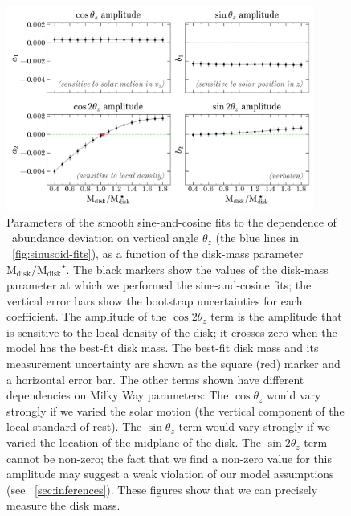 \documentclass[modern]{aastex63}
\newcommand{\ofe}{\abunratio{O}{Fe}}
\newcommand{\mdisk}{\ensuremath{\mathrm{M}_\mathrm{disk}}}
\newcommand{\mratio}{\ensuremath{\mdisk / \mdisk^\star}}
\begin{document}
\begin{figure}[!tp] %
  \begin{mdframed}
    \color{captiongray}
  \begin{center}
  \includegraphics[width=0.9\textwidth]{coeff-vs-mdisk.pdf}
  \end{center}
  \caption{%
    Parameters of the smooth sine-and-cosine fits to the dependence of \ofe\
    abundance deviation on vertical angle $\theta_z$ (the blue lines in
    \figurename~\ref{fig:sinusoid-fits}), as a function of the disk-mass
    parameter \mratio.
    The black markers show the values of the disk-mass parameter at which we
    performed the sine-and-cosine fits; the vertical error bars show the
    bootstrap uncertainties for each coefficient.
    The amplitude of the $\cos 2\theta_z$ term is the amplitude that is
    sensitive to the local density of the disk; it crosses zero when the model
    has the best-fit disk mass.
    The best-fit disk mass and its measurement uncertainty are shown as the
    square (red) marker and a horizontal error bar.
    The other terms shown have different dependencies on Milky Way parameters:
    The $\cos\theta_z$ would vary strongly if we varied the solar motion (the
    vertical component of the local standard of rest).
    The $\sin\theta_z$ term would vary strongly if we varied the location of the
    midplane of the disk.
    The $\sin 2\theta_z$ term cannot be non-zero; the fact that we find a
    non-zero value for this amplitude may suggest a weak violation of our model
    assumptions (see \sectionname~\ref{sec:inferences}).
    These figures show that we can precisely measure the disk mass.
  \label{fig:coeff-mdisk}
  }
  \end{mdframed}
\end{figure}
\end{document}
